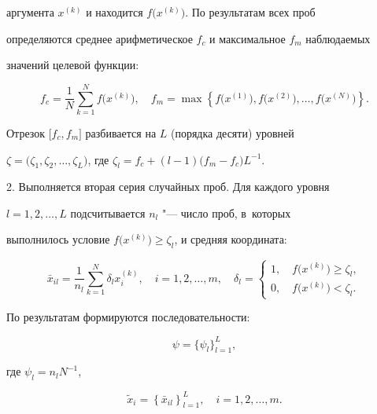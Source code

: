 аргумента $x^{(k)}$ и находится $f\big(x^{(k)}\big)$. По результатам всех проб

определяются среднее арифметическое $f_c$ и максимальное $f_m$ наблюдаемых

значений целевой функции:

\[

f_c =\frac{1}{N}\sum\limits_{k=1}^N f\big(x^{(k)}\big),

\quad

f_m =\max \left\{ f\big(x^{(1)}\big),f\big(x^{(2)}\big),\ldots,f\big(x^{(N)}\big) \right\}.

\]

Отрезок $\big[f_c,f_m\big]$ разбивается на $L$ (порядка десяти) уровней

$\zeta =\big(\zeta_1,\zeta_2 ,\ldots,\zeta _L \big)$, где $\zeta _l =f_c +(l-1)\big(f_m

-f_c \big)L^{-1}$.



2. Выполняется вторая серия случайных проб. Для каждого уровня

$l=1,2,\ldots,L$ подсчитывается $n_l$ "--- число проб, в~которых

выполнилось условие $f \big(x^{(k)} \big)\ge \zeta _l$, и средняя координата:

\[

\bar {x}_{il} =\frac{1}{n_l }\sum\limits_{k=1}^N \delta_l x_i^{(k)}

, \quad i=1,2,\ldots, m, \quad \delta _l = \begin{cases}

1, \quad f\big(x^{(k)} \big)\ge \zeta_l, \\

0, \quad f\big(x^{(k)} \big)<\zeta_l.

\end{cases}

\]

По результатам формируются последовательности:

\begin{equation}

\label{livshits:eq3}

\psi =\{\psi _l \}_{l=1}^L ,

\end{equation}

где $\psi _l =n_l N^{-1}$,

\begin{equation}

\label{livshits:eq4}

 \tilde {x}_i =\left \{\bar {x}_{il} \right\}_{l=1}^L,

\quad i=1,2,\ldots,m.

\end{equation}



